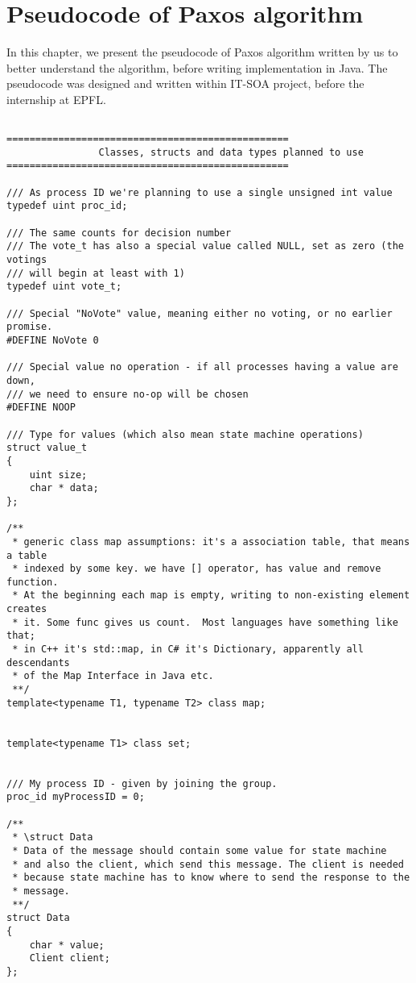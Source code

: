 ﻿\chapter{Pseudocode of Paxos algorithm}

In this chapter, we present the pseudocode of Paxos algorithm written by us to better understand the algorithm, before writing implementation in Java. The pseudocode was designed and written within IT-SOA project, before the internship at EPFL.

\begin{lstlisting}[frame=lines,caption=Pseudocode of Paxos algorithm]

=================================================
                Classes, structs and data types planned to use
=================================================

/// As process ID we're planning to use a single unsigned int value
typedef uint proc_id;

/// The same counts for decision number
/// The vote_t has also a special value called NULL, set as zero (the votings
/// will begin at least with 1)
typedef uint vote_t;

/// Special "NoVote" value, meaning either no voting, or no earlier promise.
#DEFINE NoVote 0

/// Special value no operation - if all processes having a value are down,
/// we need to ensure no-op will be chosen
#DEFINE NOOP

/// Type for values (which also mean state machine operations)
struct value_t
{
	uint size;
	char * data;
};

/**
 * generic class map assumptions: it's a association table, that means a table
 * indexed by some key. we have [] operator, has value and remove function.
 * At the beginning each map is empty, writing to non-existing element creates
 * it. Some func gives us count.  Most languages have something like that;
 * in C++ it's std::map, in C# it's Dictionary, apparently all descendants
 * of the Map Interface in Java etc.
 **/
template<typename T1, typename T2> class map;


template<typename T1> class set;


/// My process ID - given by joining the group.
proc_id myProcessID = 0;

/**
 * \struct Data
 * Data of the message should contain some value for state machine 
 * and also the client, which send this message. The client is needed
 * because state machine has to know where to send the response to the 
 * message.
 **/
struct Data
{
	char * value;
	Client client;
};


\end{lstlisting}
